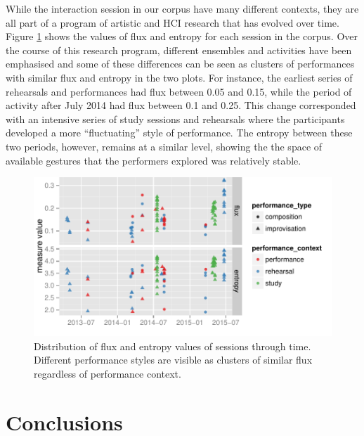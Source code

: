 \documentclass{sigchi}
\begin{document}
While the interaction session in our corpus have many different
contexts, they are all part of a program of artistic and HCI research
that has evolved over time. Figure \ref{fig:flux-entropy-through-time}
shows the values of flux and entropy for each session in the corpus.
Over the course of this research program, different ensembles and
activities have been emphasised and some of these differences can be
seen as clusters of performances with similar flux and entropy in the
two plots. For instance, the earliest series of rehearsals and
performances had flux between 0.05 and 0.15, while the period of
activity after July 2014 had flux between 0.1 and 0.25. This change
corresponded with an intensive series of study sessions and rehearsals
where the participants developed a more ``fluctuating'' style of
performance. The entropy between these two periods, however, remains
at a similar level, showing the the space of available gestures that
the performers explored was relatively stable.

\begin{figure}
  \centering
  \includegraphics[width=\linewidth]{figures/flux-entropy-through-time}
  \caption{Distribution of flux and entropy values of sessions through time.
    Different performance styles are visible as clusters of similar
    flux regardless of performance context.
    \label{fig:flux-entropy-through-time}}
\end{figure}

\section{Conclusions}
\end{document}
